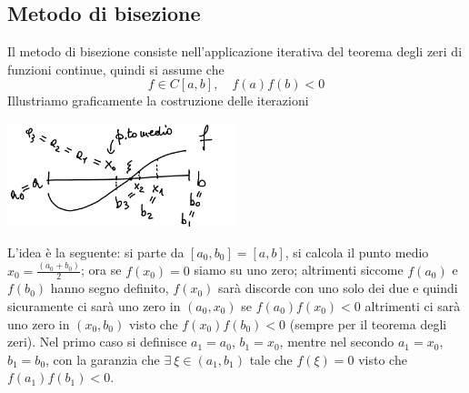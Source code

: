\subsection{Metodo di bisezione}
Il metodo di bisezione consiste nell'applicazione iterativa del teorema degli zeri di funzioni continue, quindi si assume che 
\[f \in C[a,b], \quad f(a)f(b)<0\]
Illustriamo graficamente la costruzione delle iterazioni
\begin{center}
            \includegraphics[width=0.5\textwidth]{foto/im_pag10}\par
\end{center}
L'idea è la seguente: si parte da $[a_0,b_0]=[a,b]$, si calcola il punto medio $x_0=\frac{(a_0+b_0)}{2}$; ora se $f(x_0)=0$ siamo su uno zero; altrimenti siccome $f(a_0)$ e $f(b_0)$ hanno segno definito, $f(x_0)$ sarà discorde con uno solo dei due e quindi sicuramente ci sarà uno zero in $(a_0,x_0)$ se $f(a_0)f(x_0)<0$ altrimenti ci sarà uno zero in $(x_0, b_0)$ visto che $f(x_0)f(b_0)<0$ (sempre per il teorema degli zeri). Nel primo caso si definisce $a_1=a_0$, $b_1=x_0$, mentre nel secondo $a_1=x_0$, $b_1=b_0$, con la garanzia che $\exists \ \xi \in (a_1,b_1)$ tale che $f(\xi)=0$ visto che $f(a_1)f(b_1)<0$.

